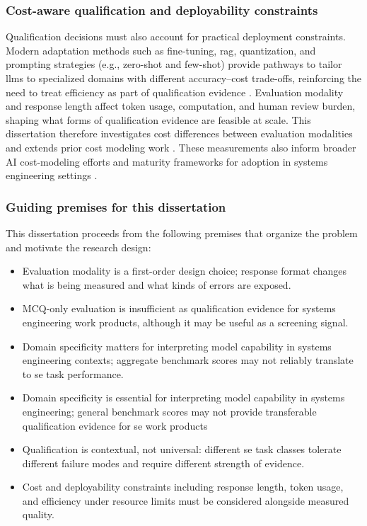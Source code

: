 \subsubsection{Cost-aware qualification and deployability constraints}\label{subsubsec:motivation_cost_aware}

Qualification decisions must also account for practical deployment constraints. Modern adaptation methods such as fine-tuning, \ac{rag}, quantization, and prompting strategies (e.g., zero-shot and few-shot) provide pathways to tailor \acp{llm} to specialized domains with different accuracy--cost trade-offs, reinforcing the need to treat efficiency as part of qualification evidence \cite{bell_BalancingAccuracyEfficiencyQuantization_2025, Wach_LLMTradeOffs_2025}. Evaluation modality and response length affect token usage, computation, and human review burden, shaping what forms of qualification evidence are feasible at scale. This dissertation therefore investigates cost differences between evaluation modalities and extends prior cost modeling work \cite{bell_BalancingAccuracyEfficiencyQuantization_2025}. These measurements also inform broader AI cost-modeling efforts and maturity frameworks for adoption in systems engineering settings 
\cite{madachy_FactoringAIAssistance_2023, madachy_SystemsAcquisitionCost_2024, Madachy_CostModelingAI_2024, madachy_GenerativeAIdrivenSystems_2025,Madachy_Bell_Longshore_2025_Generative_AI_SE_Maturity_Cost_Framework}.


\subsubsection{Guiding premises for this dissertation}\label{subsubsec:motivation_guiding_premises}

This dissertation proceeds from the following premises that organize the problem and motivate the research design:
\begin{itemize}
    \item Evaluation modality is a first-order design choice; response format changes what is being measured and what kinds of errors are exposed.
    \item MCQ-only evaluation is insufficient as qualification evidence for systems engineering work products, although it may be useful as a screening signal.
    \item Domain specificity matters for interpreting model capability in systems engineering contexts; aggregate benchmark scores may not reliably translate to \ac{se} task performance.
    \item Domain specificity is essential for interpreting model capability in systems engineering; general benchmark scores may not provide transferable qualification evidence for \ac{se} work products
    \item Qualification is contextual, not universal: different \ac{se} task classes tolerate different failure modes and require different strength of evidence.
    \item Cost and deployability constraints including response length, token usage, and efficiency under resource limits must be considered alongside measured quality.
\end{itemize}


